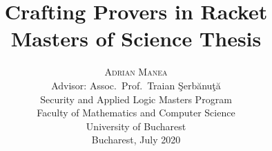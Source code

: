 \documentclass[12pt, a4paper]{report}
\begin{document}


\title{{\huge\textbf{Crafting Provers in Racket}} \\
  {\Large Masters of Science Thesis}}

\author{\Large\textsc{Adrian Manea} \\
  {\large{Advisor: Assoc.\ Prof.\ Traian \c{S}erb\u{a}nu\c{t}\u{a}}} \\[6cm]

  Security and Applied Logic Masters Program \\
  Faculty of Mathematics and Computer Science \\
  University of Bucharest \\[4cm]

  Bucharest, July 2020}

\date{}

\maketitle

\tableofcontents

\setcounter{page}{1} %









% 






\renewcommand{\indexname}{Index}
\printindex



\nocite{*}
\end{document}
